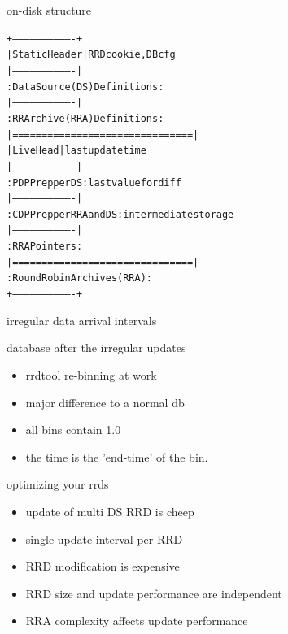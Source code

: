 \begin{frame}[fragile]{on-disk structure}
\begin{alltt}
+-------------------------------+
| Static Header                 | \textrm{RRD cookie, DB cfg}
|-------------------------------|\pause 
: Data Source (DS) Definitions  : 
|-------------------------------|\pause
: RR Archive (RRA) Definitions  : 
|===============================|\pause
| Live Head                     | \textrm{last update time}
|-------------------------------|\pause 
: PDP Prep per DS               : \textrm{last value for diff}
|-------------------------------|\pause
: CDP Prep per RRA and DS       : \textrm{intermediate storage}
|-------------------------------|\pause
: RRA Pointers                  :
|===============================|\pause
: Round Robin Archives (RRA)    :
+-------------------------------+
\end{alltt}
\end{frame}

\begin{frame}{irregular data arrival intervals}

\end{frame}


\begin{frame}{database after the irregular updates}



\begin{itemize}[<+-| alert@+>]
\item rrdtool re-binning at work
\item major difference to a normal db
\item all bins contain 1.0
\item the time is the 'end-time' of the bin.
\end{itemize}
\end{frame}

\begin{frame}{optimizing your rrds}
\begin{itemize}[<+-| alert@+>]
\item update of multi DS RRD is cheep
\item single update interval per RRD
\item RRD modification is expensive
\item RRD size and update performance are independent
\item RRA complexity affects update performance
\end{itemize}
\end{frame}

